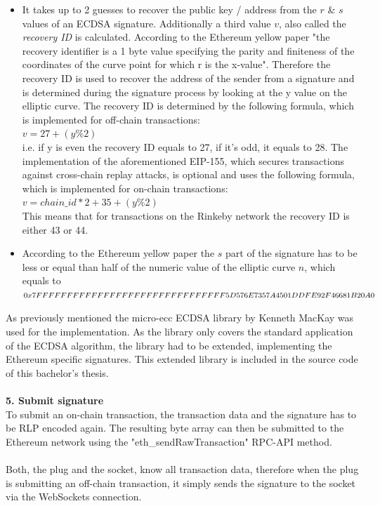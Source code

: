 \begin{itemize}
  \item It takes up to 2 guesses to recover the public key / address from the $r$ \& $s$ values of an ECDSA signature. Additionally a third value $v$, also called the \textit{recovery ID} is calculated. According to the Ethereum yellow paper\cite{ethereum-yellow-paper} "the recovery identifier is a 1 byte value specifying the parity and finiteness of the coordinates of the curve point for which r is the x-value". Therefore the recovery ID is used to recover the address of the sender from a signature and is determined during the signature process by looking at the y value on the elliptic curve. The recovery ID is determined by the following formula, which is implemented for off-chain transactions:
  \\
  $v = 27 + (y \% 2)$
  \\
  i.e. if y is even the recovery ID equals to 27, if it's odd, it equals to 28. The implementation of the aforementioned EIP-155, which secures transactions against cross-chain replay attacks, is optional and uses the following formula, which is implemented for on-chain transactions:
  \\
  $v = chain\_id * 2 + 35 + (y \% 2)$
  \\
  This means that for transactions on the Rinkeby network the recovery ID is either 43 or 44.
  \item According to the Ethereum yellow paper\cite{ethereum-yellow-paper} the $s$ part of the signature has to be less or equal than half of the numeric value of the elliptic curve $n$, which equals to 
  $0x7FFFFFFFFFFFFFFFFFFFFFFFFFFF
  \\FFFF5D576E7357A4501DDFE92F46681B20A0$
\end{itemize}
As previously mentioned the micro-ecc ECDSA library by Kenneth MacKay was used for the implementation. As the library only covers the standard application of the ECDSA algorithm, the library had to be extended, implementing the Ethereum specific signatures. This extended library is included in the source code of this bachelor’s thesis.
\\\\
\textbf{5. Submit signature}\\
To submit an on-chain transaction, the transaction data and the signature has to be RLP encoded again. The resulting byte array can then be submitted to the Ethereum network using the "eth\_sendRawTransaction" RPC-API method.
\\\\
Both, the plug and the socket, know all transaction data, therefore when the plug is submitting an off-chain transaction, it simply sends the signature to the socket via the WebSockets connection.
\\
